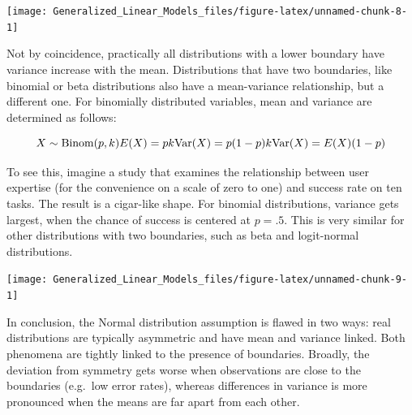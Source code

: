 \documentclass[]{svmono}
\newenvironment{Shaded}{\begin{snugshade}}{\end{snugshade}}
\newcommand{\KeywordTok}[1]{\textcolor[rgb]{0.13,0.29,0.53}{\textbf{#1}}}
\newcommand{\DataTypeTok}[1]{\textcolor[rgb]{0.13,0.29,0.53}{#1}}
\newcommand{\DecValTok}[1]{\textcolor[rgb]{0.00,0.00,0.81}{#1}}
\newcommand{\StringTok}[1]{\textcolor[rgb]{0.31,0.60,0.02}{#1}}
\newcommand{\OperatorTok}[1]{\textcolor[rgb]{0.81,0.36,0.00}{\textbf{#1}}}
\newcommand{\NormalTok}[1]{#1}
\begin{document}
\texttt{[image: Generalized\_Linear\_Models\_files/figure-latex/unnamed-chunk-8-1]}

Not by coincidence, practically all distributions with a lower boundary
have variance increase with the mean. Distributions that have two
boundaries, like binomial or beta distributions also have a
mean-variance relationship, but a different one. For binomially
distributed variables, mean and variance are determined as follows:

\[
X \sim \textrm{Binom}(p, k)\\
E(X) = p k\\
\textrm{Var}(X) = p (1-p) k\\
\textrm{Var}(X) = E(X)(1-p)
\]

To see this, imagine a study that examines the relationship between user
expertise (for the convenience on a scale of zero to one) and success
rate on ten tasks. The result is a cigar-like shape. For binomial
distributions, variance gets largest, when the chance of success is
centered at \(p = .5\). This is very similar for other distributions
with two boundaries, such as beta and logit-normal distributions.

\begin{Shaded}
\end{Shaded}

\texttt{[image: Generalized\_Linear\_Models\_files/figure-latex/unnamed-chunk-9-1]}

In conclusion, the Normal distribution assumption is flawed in two ways:
real distributions are typically asymmetric and have mean and variance
linked. Both phenomena are tightly linked to the presence of boundaries.
Broadly, the deviation from symmetry gets worse when observations are
close to the boundaries (e.g.~low error rates), whereas differences in
variance is more pronounced when the means are far apart from each
other.
\end{document}
